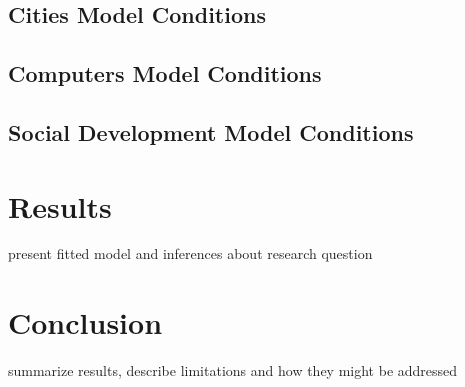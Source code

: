 \documentclass[12pt]{article}
\begin{document}
\subsection{Cities Model Conditions}
\subsection{Computers Model Conditions}
\subsection{Social Development Model Conditions}



\section{Results}
present fitted model and inferences about research question



\section{Conclusion}
summarize results, describe limitations and how they might be addressed



\theendnotes
\end{document}
